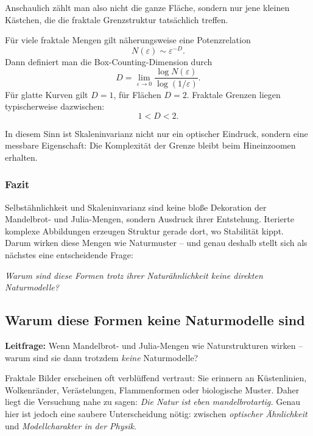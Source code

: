 Anschaulich zählt man also nicht die ganze Fläche,
sondern nur jene kleinen Kästchen,
die die fraktale Grenzstruktur tatsächlich treffen.

\begin{MathBox}
\label{box:boxcounting}
\small
Für viele fraktale Mengen gilt näherungsweise eine Potenzrelation
\[
N(\varepsilon)\sim \varepsilon^{-D}.
\]
Dann definiert man die Box-Counting-Dimension durch
\[
D=\lim_{\varepsilon\to 0}\frac{\log N(\varepsilon)}{\log(1/\varepsilon)}.
\]
Für glatte Kurven gilt $D=1$,
für Flächen $D=2$.
Fraktale Grenzen liegen typischerweise dazwischen:
\[
1<D<2.
\]
\end{MathBox}

In diesem Sinn ist Skaleninvarianz nicht nur ein optischer Eindruck,
sondern eine messbare Eigenschaft:
Die Komplexität der Grenze bleibt beim Hineinzoomen erhalten.

\subsubsection*{Fazit}

Selbstähnlichkeit und Skaleninvarianz sind keine bloße \glqq Dekoration\grqq{}
der Mandelbrot- und Julia-Mengen,
sondern Ausdruck ihrer Entstehung.
Iterierte komplexe Abbildungen erzeugen Struktur gerade dort,
wo Stabilität kippt.
Darum wirken diese Mengen wie Naturmuster --
und genau deshalb stellt sich als nächstes eine entscheidende Frage:

\medskip
\noindent\emph{Warum sind diese Formen trotz ihrer Naturähnlichkeit keine direkten Naturmodelle?}


\subsection{Warum diese Formen keine Naturmodelle sind}

\textbf{Leitfrage:} Wenn Mandelbrot- und Julia-Mengen wie Naturstrukturen wirken -- warum sind sie dann trotzdem \emph{keine} Naturmodelle?

Fraktale Bilder erscheinen oft verblüffend vertraut:
Sie erinnern an Küstenlinien, Wolkenränder, Verästelungen, Flammenformen oder biologische Muster.
Daher liegt die Versuchung nahe zu sagen:
\emph{Die Natur ist eben mandelbrotartig.}
Genau hier ist jedoch eine saubere Unterscheidung nötig:
zwischen \emph{optischer Ähnlichkeit} und \emph{Modellcharakter in der Physik}.

